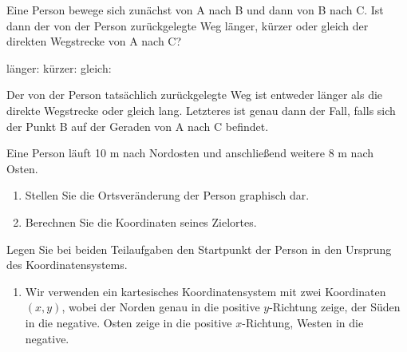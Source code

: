 \begin{MExercises}
\begin{MExercise} 
Eine Person bewege sich zun\"achst von A nach B und dann von B nach C. Ist dann der von der Person zur\"uckgelegte Weg l\"anger, k\"urzer oder gleich der direkten Wegstrecke von A nach C?

\begin{MQuestionGroup}
l\"anger:  
k\"urzer:  
gleich:  
\end{MQuestionGroup}


\begin{MSolution}Der von der Person tats\"achlich zur\"uckgelegte Weg ist entweder l\"anger als die direkte Wegstrecke oder gleich lang. Letzteres ist genau dann der Fall, falls sich der Punkt B auf der Geraden von A nach C befindet.
\end{MSolution}
\end{MExercise}

\begin{MExercise}
Eine Person l\"auft 10 m nach Nordosten und anschlie{\ss}end weitere 8 m nach Osten.
\begin{enumerate}
\item Stellen Sie die Ortsver\"anderung der Person graphisch dar. 
\item Berechnen Sie die Koordinaten seines Zielortes.
\end{enumerate} 
Legen Sie bei beiden Teilaufgaben den Startpunkt der Person in den Ursprung des Koordinatensystems.

\begin{MSolution} 
\begin{enumerate}
\item Wir verwenden ein kartesisches Koordinatensystem mit zwei Koordinaten $(x,y)$, wobei der Norden genau in die positive $y$-Richtung zeige, der S\"uden in die negative. Osten zeige in die positive $x$-Richtung, Westen in die negative. 




\end{enumerate}
\end{MSolution}
\end{MExercise}
\end{MExercises}
